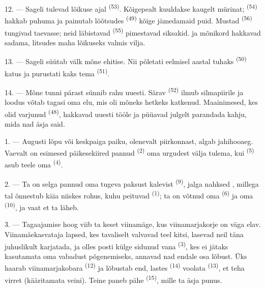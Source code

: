 \VUsaut{5.0mm}
\VUsaut{3.4mm}

12. --- Sageli tulevad lõikuse ajal  \textsuperscript{(53)}. Kõigepealt
kuuldakse kaugelt  mürinat;  \textsuperscript{(54)} hakkab
puhuma ja painutab lõõtsudes  \textsuperscript{(49)} kõige jämedamaid puid.
Mustad  \textsuperscript{(56)} tungivad taevasse; neid läbistavad
 \textsuperscript{(55)} pimestavad siksakid.  ja mõnikord
 hakkavad sadama, litsudes maha lõikuseks valmis vilja.

13. --- Sageli süütab välk mõne ehitise. Nii põletati eelmisel aastal tuhaks
 \textsuperscript{(50)} katus ja purustati kaks tema 
\textsuperscript{(51)}.

14. --- Mõne tunni pärast sünnib rahu uuesti. Särav 
\textsuperscript{(52)} ilmub silmapiirile ja loodus võtab tagasi oma elu, mis oli mõneks
hetkeks katkenud. Maainimesed, kes olid varjunud 
\textsuperscript{(48)}, hakkavad uuesti tööle ja püüavad julgelt parandada kahju, mida
nad äsja said.

\VUsaut{6.0mm}
\VUsaut{3.6mm}

\VUsaut{1.4mm}
\VUsaut{4.0mm}

1. --- Augusti lõpu või  keskpaiga paiku, olenevalt piirkonnast, algab
jahihooaeg. Vaevalt on esimesed päikesekiired pannud 
\textsuperscript{(2)} oma urgudest välja tulema, kui  \textsuperscript{(5)}
asub teele oma  \textsuperscript{(4)}.

2. --- Ta on selga pannud oma tugeva paksust kalevist 
\textsuperscript{(9)}, jalga nahksed , millega tal õnnestub käia
niiskes rohus, kuhu peituvad  \textsuperscript{(1)}; ta on võtnud oma
 \textsuperscript{(6)} ja oma  \textsuperscript{(10)}, ja
vaat et ta läheb.

3. --- Tagaajamise hoog viib ta keset viinamäge, kus viinamarjakorje on väga elav.
Viinamäekasvataja lapsed, kes tavaliselt valvavad teel kitsi, lasevad neil täna
juhuslikult karjatada, ja olles posti külge sidunud vana 
\textsuperscript{(3)}, kes ei jätaks kasutamata oma vabadust põgenemiseks, annavad nad
endale osa lõbust. Üks haarab viinamarjakobara 
\textsuperscript{(12)} ja lõbustab end, lastes  \textsuperscript{(14)}
voolata  \textsuperscript{(13)}, et teha virret (kääritamata veini).
Teine paneb pähe  \textsuperscript{(15)}, mille ta äsja punus.


